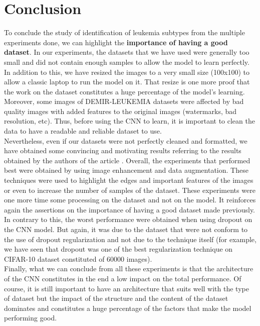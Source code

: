 \documentclass[11pt, openany]{report}
\theoremstyle{plain}
\theoremstyle{definition}
\theoremstyle{remark}
\begin{document}
\newpage
\section{Conclusion}

To conclude the study of identification of leukemia subtypes from the multiple experiments done, we can highlight the \textbf{importance of having a good dataset}. In our experiments, the datasets that we have used were generally too small and did not contain enough samples to allow the model to learn perfectly. In addition to this, we have resized the images to a very small size (100x100) to allow a classic laptop to run the model on it. That resize is one more proof that the work on the dataset constitutes a huge percentage of the model's learning. Moreover, some images of DEMIR-LEUKEMIA datasets were affected by bad quality images with added features to the original images (watermarks, bad resolution, etc). Thus, before using the CNN to learn, it is important to clean the data to have a readable and reliable dataset to use.\\

Nevertheless, even if our datasets were not perfectly cleaned and formatted, we have obtained some convincing and motivating results referring to the results obtained by the authors of the article \cite{leukemia}. Overall, the experiments that performed best were obtained by using image enhancement and data augmentation. These techniques were used to highlight the edges and important features of the images or even to increase the number of samples of the dataset. These experiments were one more time some processing on the dataset and not on the model. It reinforces again the assertions on the importance of having a good dataset made previously. In contrary to this, the worst performance were obtained when using dropout on the CNN model. But again, it was due to the dataset that were not conform to the use of dropout regularization and not due to the technique itself (for example, we have seen that dropout was one of the best regularization technique on CIFAR-10 dataset constituted of 60000 images). \\ 

Finally, what we can conclude from all these experiments is that the architecture of the CNN constitutes in the end a low impact on the total performance. Of course, it is still important to have an architecture that suits well with the type of dataset but the impact of the structure and the content of the dataset dominates and constitutes a huge percentage of the factors that make the model performing good.  
\end{document}
